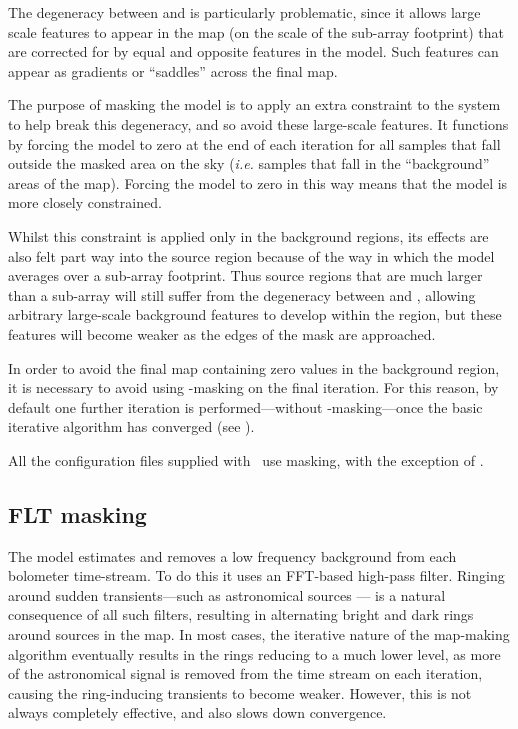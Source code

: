 The degeneracy between  and  is particularly
problematic, since it allows large scale features to appear in the map
(on the scale of the sub-array footprint) that are corrected for by equal
and opposite features in the  model. Such features can appear
as gradients or ``saddles'' across the final map.

The purpose of masking the  model is to apply an extra
constraint to the system to help break this degeneracy, and so avoid
these large-scale features. It functions by forcing the  model
to zero at the end of each iteration for all samples that fall outside the
masked area on the sky (\emph{i.e.} samples that fall in the ``background''
areas of the map). Forcing the  model to zero in this way means
that the  model is more closely constrained.

Whilst this constraint is applied only in the background regions, its
effects are also felt part way into the source region because of the way in
which the  model averages over a sub-array footprint. Thus source
regions that are much larger than a sub-array will still suffer from the
degeneracy between  and , allowing arbitrary
large-scale background features to develop within the region, but these
features will become weaker as the edges of the mask are approached.

In order to avoid the final  map containing zero values in the background
region, it is necessary to avoid using -masking on the final
iteration. For this reason, by default one further iteration is
performed---without -masking---once the basic iterative algorithm has
converged (see ).

All the configuration files supplied with \smurf\ use 
masking, with the exception of \blankfield.

\subsection{FLT masking}
\label{sec:fltmask}

The  model estimates and removes a low frequency background
from each bolometer time-stream. To do this it uses an FFT-based high-pass
filter. Ringing around sudden transients---such as astronomical sources
--- is a natural consequence of all such filters, resulting in alternating
bright and dark rings around sources in the map. In most cases, the iterative
nature of the map-making algorithm eventually results in the rings
reducing to a much lower level, as more of the astronomical signal is removed
from the time stream on each iteration, causing the ring-inducing
transients to become weaker. However, this is not always completely
effective, and also slows down convergence.


